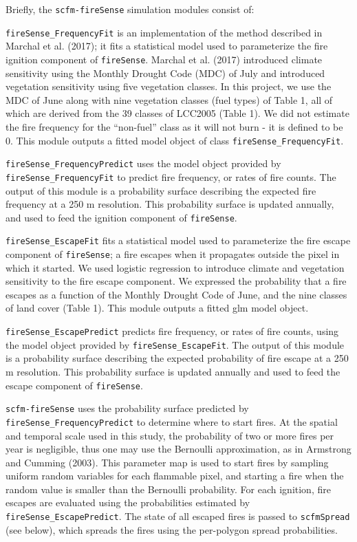 \documentclass[]{article}
\begin{document}
Briefly, the \texttt{scfm-fireSense} simulation modules consist of:

\texttt{fireSense\_FrequencyFit} is an implementation of the method
described in Marchal et al. (2017); it fits a statistical model used to
parameterize the fire ignition component of \texttt{fireSense}. Marchal
et al. (2017) introduced climate sensitivity using the Monthly Drought
Code (MDC) of July and introduced vegetation sensitivity using five
vegetation classes. In this project, we use the MDC of June along with
nine vegetation classes (fuel types) of Table 1, all of which are
derived from the 39 classes of LCC2005 (Table 1). We did not estimate
the fire frequency for the ``non-fuel'' class as it will not burn - it
is defined to be 0. This module outputs a fitted model object of class
\texttt{fireSense\_FrequencyFit}.

\texttt{fireSense\_FrequencyPredict} uses the model object provided by
\texttt{fireSense\_FrequencyFit} to predict fire frequency, or rates of
fire counts. The output of this module is a probability surface
describing the expected fire frequency at a 250 m resolution. This
probability surface is updated annually, and used to feed the ignition
component of \texttt{fireSense}.

\texttt{fireSense\_EscapeFit} fits a statistical model used to
parameterize the fire escape component of \texttt{fireSense}; a fire
escapes when it propagates outside the pixel in which it started. We
used logistic regression to introduce climate and vegetation sensitivity
to the fire escape component. We expressed the probability that a fire
escapes as a function of the Monthly Drought Code of June, and the nine
classes of land cover (Table 1). This module outputs a fitted glm model
object.

\texttt{fireSense\_EscapePredict} predicts fire frequency, or rates of
fire counts, using the model object provided by
\texttt{fireSense\_EscapeFit}. The output of this module is a
probability surface describing the expected probability of fire escape
at a 250 m resolution. This probability surface is updated annually and
used to feed the escape component of \texttt{fireSense}.

\texttt{scfm-fireSense} uses the probability surface predicted by
\texttt{fireSense\_FrequencyPredict} to determine where to start fires.
At the spatial and temporal scale used in this study, the probability of
two or more fires per year is negligible, thus one may use the Bernoulli
approximation, as in Armstrong and Cumming (2003). This parameter map is
used to start fires by sampling uniform random variables for each
flammable pixel, and starting a fire when the random value is smaller
than the Bernoulli probability. For each ignition, fire escapes are
evaluated using the probabilities estimated by
\texttt{fireSense\_EscapePredict}. The state of all escaped fires is
passed to \texttt{scfmSpread} (see below), which spreads the fires using
the per-polygon spread probabilities.
\end{document}
